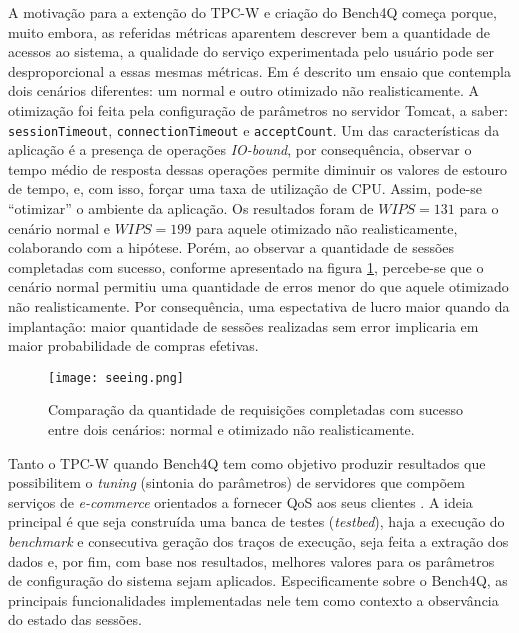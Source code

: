 A motivação para a extenção do TPC-W e criação do Bench4Q começa porque, muito embora, as referidas métricas aparentem descrever bem a quantidade de acessos ao sistema, a qualidade do serviço experimentada pelo usuário pode ser desproporcional a essas mesmas métricas. Em  é descrito um ensaio que contempla dois cenários diferentes: um normal e outro otimizado não realisticamente. A otimização foi feita pela configuração de parâmetros no servidor Tomcat, a saber: \texttt{sessionTimeout}, \texttt{connectionTimeout} e \texttt{acceptCount}. Um das características da aplicação é a presença de operações \textit{ IO-bound}, por consequência, observar o tempo médio de resposta dessas operações permite diminuir os valores de estouro de tempo, e, com isso, forçar uma taxa de utilização de CPU. Assim, pode-se ``otimizar'' o ambiente da aplicação. Os resultados foram de $WIPS = 131$ para o cenário normal e $WIPS=199$ para aquele otimizado não realisticamente, colaborando com a hipótese. Porém, ao observar a quantidade de sessões completadas com sucesso, conforme apresentado na figura \ref{fig:seeing}, percebe-se que o cenário normal permitiu uma quantidade de erros menor do que aquele otimizado não realisticamente. Por consequência, uma espectativa de lucro maior quando da implantação: maior quantidade de sessões realizadas sem error implicaria em maior probabilidade de compras efetivas.

\begin{figure}[htb]
	\centering
	\texttt{[image: seeing.png]}
	\caption{Comparação da quantidade de requisições completadas com sucesso entre dois cenários: normal e otimizado não realisticamente.}
	\label{fig:seeing}
\end{figure}


Tanto o TPC-W quando Bench4Q tem como objetivo produzir resultados que possibilitem o \textit{tuning} (sintonia do parâmetros) de servidores que compõem serviços de \textit{e-commerce} orientados a fornecer QoS aos seus clientes \cite{Menasce2002, Zhang2011}.  A ideia principal é que seja construída uma banca de testes (\textit{testbed}), haja a execução do \textit{benchmark} e consecutiva geração dos traços de execução, seja feita a extração dos dados e, por fim, com base nos resultados, melhores valores para os parâmetros de configuração do sistema sejam aplicados. Especificamente sobre o Bench4Q, as principais funcionalidades implementadas nele tem como contexto a observância do estado das sessões.

